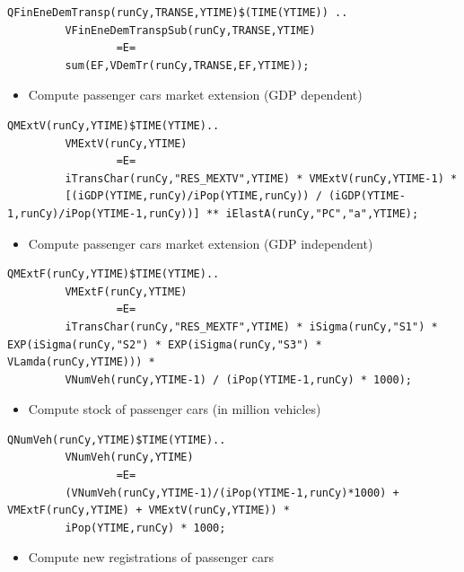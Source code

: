 \documentclass[a4paper,]{scrartcl}
\providecommand{\tightlist}{%
  \setlength{\itemsep}{0pt}\setlength{\parskip}{0pt}}
\begin{document}
\begin{lstlisting}
QFinEneDemTransp(runCy,TRANSE,YTIME)$(TIME(YTIME)) ..
         VFinEneDemTranspSub(runCy,TRANSE,YTIME)
                 =E=
         sum(EF,VDemTr(runCy,TRANSE,EF,YTIME));
\end{lstlisting}

\begin{itemize}
\tightlist
\item
  Compute passenger cars market extension (GDP dependent)
\end{itemize}

\begin{lstlisting}
QMExtV(runCy,YTIME)$TIME(YTIME)..
         VMExtV(runCy,YTIME)
                 =E=
         iTransChar(runCy,"RES_MEXTV",YTIME) * VMExtV(runCy,YTIME-1) *
         [(iGDP(YTIME,runCy)/iPop(YTIME,runCy)) / (iGDP(YTIME-1,runCy)/iPop(YTIME-1,runCy))] ** iElastA(runCy,"PC","a",YTIME);
\end{lstlisting}

\begin{itemize}
\tightlist
\item
  Compute passenger cars market extension (GDP independent)
\end{itemize}

\begin{lstlisting}
QMExtF(runCy,YTIME)$TIME(YTIME)..
         VMExtF(runCy,YTIME)
                 =E=
         iTransChar(runCy,"RES_MEXTF",YTIME) * iSigma(runCy,"S1") * EXP(iSigma(runCy,"S2") * EXP(iSigma(runCy,"S3") * VLamda(runCy,YTIME))) *
         VNumVeh(runCy,YTIME-1) / (iPop(YTIME-1,runCy) * 1000);
\end{lstlisting}

\begin{itemize}
\tightlist
\item
  Compute stock of passenger cars (in million vehicles)
\end{itemize}

\begin{lstlisting}
QNumVeh(runCy,YTIME)$TIME(YTIME)..
         VNumVeh(runCy,YTIME)
                 =E=
         (VNumVeh(runCy,YTIME-1)/(iPop(YTIME-1,runCy)*1000) + VMExtF(runCy,YTIME) + VMExtV(runCy,YTIME)) *
         iPop(YTIME,runCy) * 1000;
\end{lstlisting}

\begin{itemize}
\tightlist
\item
  Compute new registrations of passenger cars
\end{itemize}
\end{document}

